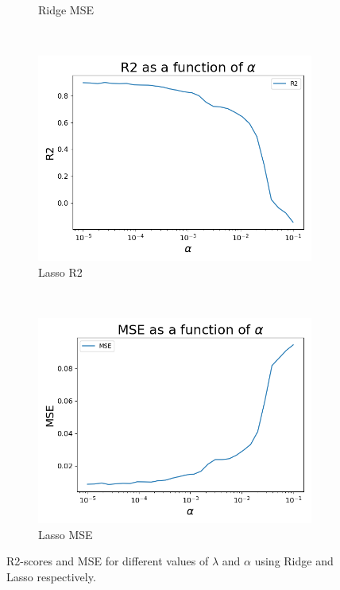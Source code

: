 \documentclass[12pt]{article}
\begin{document}
\begin{figure}[H]
\begin{subfigure}[t]{0.48\textwidth}
\caption{Ridge MSE}
\label{figRD:RMSE}
\end{subfigure}
\\
\begin{subfigure}[t]{0.48\textwidth}
\includegraphics[width=\linewidth]{../figures/LassoR2.png}
\caption{Lasso R2}
\label{figRD:LR2}
\end{subfigure}
\
\begin{subfigure}[t]{0.48\textwidth}
\includegraphics[width = \linewidth]{../figures/LassoMSE.png}
\caption{Lasso MSE}
\label{figRD:LMSE}
\end{subfigure}
\caption{R2-scores and MSE for different values of $\lambda$ and $\alpha$ using Ridge and Lasso respectively.}
\label{figRD:RLR2MSE}
\end{figure}
\end{document}
